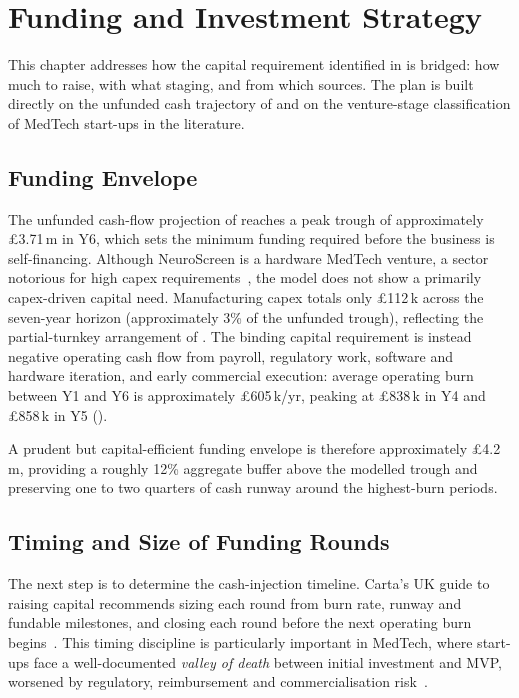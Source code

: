 \chapter{Funding and Investment Strategy}
\label{chapter:ent-funding}


This chapter addresses how the capital requirement identified in  is bridged: how much to raise, with what staging, and from which sources. The plan is built directly on the unfunded cash trajectory of  and on the venture-stage classification of MedTech start-ups in the literature.


\section{Funding Envelope}
\label{sec:ent-fund-req}

The unfunded cash-flow projection of  reaches a peak trough of approximately \pounds3.71\,m in Y6, which sets the minimum funding required before the business is self-financing. Although NeuroScreen is a hardware MedTech venture, a sector notorious for high capex requirements~\cite{meridian_medtech_capex}, the model does not show a primarily capex-driven capital need. Manufacturing capex totals only \pounds112\,k across the seven-year horizon (approximately 3\% of the unfunded trough), reflecting the partial-turnkey arrangement of . The binding capital requirement is instead negative operating cash flow from payroll, regulatory work, software and hardware iteration, and early commercial execution: average operating burn between Y1 and Y6 is approximately \pounds605\,k/yr, peaking at \pounds838\,k in Y4 and \pounds858\,k in Y5 ().

A prudent but capital-efficient funding envelope is therefore approximately \pounds4.2\,m, providing a roughly 12\% aggregate buffer above the modelled trough and preserving one to two quarters of cash runway around the highest-burn periods.


\section{Timing and Size of Funding Rounds}
\label{sec:ent-fund-timing}

The next step is to determine the cash-injection timeline. Carta's UK guide to raising capital recommends sizing each round from burn rate, runway and fundable milestones, and closing each round before the next operating burn begins~\cite{carta_fundraising}. This timing discipline is particularly important in MedTech, where start-ups face a well-documented \emph{valley of death} between initial investment and MVP, worsened by regulatory, reimbursement and commercialisation risk~\cite{advamed_valley}.

